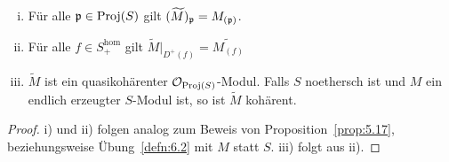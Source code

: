 \begin{prop}
\label{prop:9.17}
	\begin{enumerate}[i)]
		\item\label{prop:9.17:i} Für alle $\mathfrak{p} \in \operatorname{Proj}(S)$ gilt $(\widetilde{M})_{\mathfrak{p}} = M_{(\mathfrak{p})}$.
		\item\label{prop:9.17:ii} Für alle $f\in S_+^{\text{hom}}$ gilt $\widetilde{M}\vert_{D^+(f)} = \widetilde{M_{(f)}}$
		\item\label{prop:9.17:iii} $\widetilde{M}$ ist ein quasikohärenter $\mathcal{O}_{\operatorname{Proj}(S)}$-Modul. Falls $S$ noethersch ist und $M$ ein endlich erzeugter $S$-Modul ist, so ist $\widetilde{M}$ kohärent.
	\end{enumerate}
	\begin{proof}
		i) und ii) folgen analog zum Beweis von Proposition~\ref{prop:5.17}, beziehungsweise Übung~\ref{defn:6.2} mit $M$ statt $S$. iii) folgt aus ii).
	\end{proof}
\end{prop}

